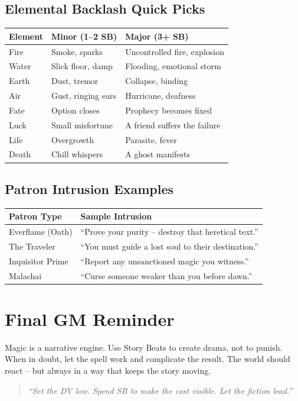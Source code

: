 \subsection*{Elemental Backlash Quick Picks}
\begin{center}
\begin{tabular}{lll}
\toprule
\textbf{Element} & \textbf{Minor (1--2 SB)} & \textbf{Major (3+ SB)} \\
\midrule
Fire & Smoke, sparks & Uncontrolled fire, explosion \\
Water & Slick floor, damp & Flooding, emotional storm \\
Earth & Dust, tremor & Collapse, binding \\
Air & Gust, ringing ears & Hurricane, deafness \\
Fate & Option closes & Prophecy becomes fixed \\
Luck & Small misfortune & A friend suffers the failure \\
Life & Overgrowth & Parasite, fever \\
Death & Chill whispers & A ghost manifests \\
\bottomrule
\end{tabular}
\end{center}

\subsection*{Patron Intrusion Examples}
\begin{center}
\begin{tabular}{ll}
\toprule
\textbf{Patron Type} & \textbf{Sample Intrusion} \\
\midrule
Everflame (Oath) & ``Prove your purity -- destroy that heretical text.'' \\
The Traveler & ``You must guide a lost soul to their destination.'' \\
Inquisitor Prime & ``Report any unsanctioned magic you witness.'' \\
Malachai & ``Curse someone weaker than you before dawn.'' \\
\bottomrule
\end{tabular}
\end{center}

\section*{Final GM Reminder}
Magic is a narrative engine. Use Story Beats to create drama, not to punish. When in doubt, let the spell work and complicate the result. The world should react -- but always in a way that keeps the story moving.

\begin{quote}
\emph{``Set the DV low. Spend SB to make the cost visible. Let the fiction lead.''}
\end{quote}